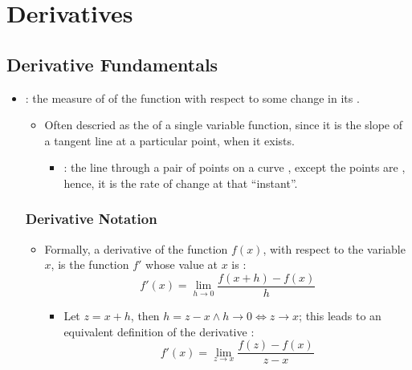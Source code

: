 \chapter{Derivatives}


\section{Derivative Fundamentals}
\begin{itemize}
  \item {}: the measure of  of the
    function  with respect to some change in its .
    \begin{itemize}
      \item Often descried as the  of a
        single variable function, since it is the slope of a tangent line at a
        particular point, when it exists.
        \begin{itemize}
          \item {}: the line through a pair of points on a curve
            , except the points are ,
            hence, it is the rate of change at that ``instant''.
        \end{itemize}

    \end{itemize}


  \subsection{Derivative Notation}
  \begin{itemize}
    \item Formally, a derivative of the function \( f(x) \), with respect to the
      variable  \( x \), is the function \( f' \) whose value at \( x \) is
      :
      \[
        f'(x) = \lim_{h \to 0} \frac{f(x+h) - f(x)}{h}
      \]
      \begin{itemize}
        \item Let \( z = x + h \), then \( h = z - x \land h \to 0 \iff z
            \to x \); this leads to an equivalent definition of the derivative
            :
            \[
              f'(x) = \lim_{z \to x} \frac{f(z) - f(x)}{z - x}
            \]
      \end{itemize}


\end{itemize}
\end{itemize}

